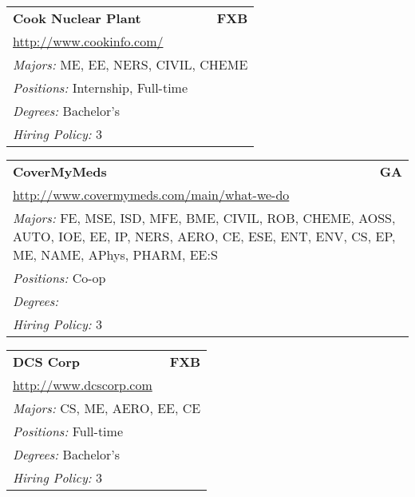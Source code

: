 \documentclass[twoside]{article}
\begin{document}
\begin{center}
\begin{multicols}{3}
\begin{FlushLeft}
\begin{minipage}{.9\columnwidth}
\end{minipage}
 
\begin{minipage}{.9\columnwidth}\begin{tabularx}{.95\columnwidth}{Xr}
                 {\Large\bf Cook Nuclear Plant} & {\Large\bf FXB}\\
    \multicolumn{2}{p{.95\columnwidth}}{\url{http://www.cookinfo.com/}}\\
    \multicolumn{2}{p{.95\columnwidth}}{\emph{Majors:} ME, EE, NERS, CIVIL, CHEME}\\
    \multicolumn{2}{p{.95\columnwidth}}{\emph{Positions:} Internship, Full-time}\\
    \multicolumn{2}{p{.95\columnwidth}}{\emph{Degrees:} Bachelor's}\\
    \multicolumn{2}{p{.95\columnwidth}}{\emph{Hiring Policy:} 3}\\
    \end{tabularx}
    
\end{minipage}
 
\begin{minipage}{.9\columnwidth}\begin{tabularx}{.95\columnwidth}{Xr}
                 {\Large\bf CoverMyMeds} & {\Large\bf GA}\\
    \multicolumn{2}{p{.95\columnwidth}}{\url{http://www.covermymeds.com/main/what-we-do}}\\
    \multicolumn{2}{p{.95\columnwidth}}{\emph{Majors:} FE, MSE, ISD, MFE, BME, CIVIL, ROB, CHEME, AOSS, AUTO, IOE, EE, IP, NERS, AERO, CE, ESE, ENT, ENV, CS, EP, ME, NAME, APhys, PHARM, EE:S}\\
    \multicolumn{2}{p{.95\columnwidth}}{\emph{Positions:} Co-op}\\
    \multicolumn{2}{p{.95\columnwidth}}{\emph{Degrees:} }\\
    \multicolumn{2}{p{.95\columnwidth}}{\emph{Hiring Policy:} 3}\\
    \end{tabularx}
    
\end{minipage}
 
\begin{minipage}{.9\columnwidth}\begin{tabularx}{.95\columnwidth}{Xr}
                 {\Large\bf DCS Corp} & {\Large\bf FXB}\\
    \multicolumn{2}{p{.95\columnwidth}}{\url{http://www.dcscorp.com}}\\
    \multicolumn{2}{p{.95\columnwidth}}{\emph{Majors:} CS, ME, AERO, EE, CE}\\
    \multicolumn{2}{p{.95\columnwidth}}{\emph{Positions:} Full-time}\\
    \multicolumn{2}{p{.95\columnwidth}}{\emph{Degrees:} Bachelor's}\\
    \multicolumn{2}{p{.95\columnwidth}}{\emph{Hiring Policy:} 3}\\
    \end{tabularx}
    

\end{minipage}
\end{FlushLeft}
\end{multicols}
\end{center}
\end{document}
